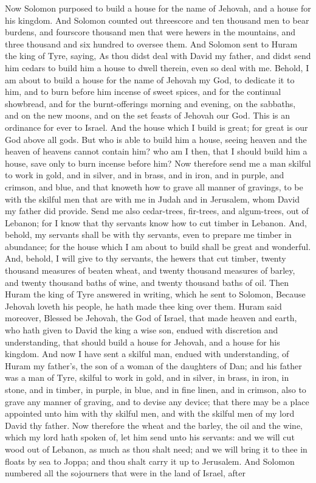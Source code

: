 Now Solomon purposed to build a house for the name of Jehovah, and a house for his kingdom. And Solomon counted out threescore and ten thousand men to bear burdens, and fourscore thousand men that were hewers in the mountains, and three thousand and six hundred to oversee them. And Solomon sent to Huram the king of Tyre, saying, As thou didst deal with David my father, and didst send him cedars to build him a house to dwell therein, even so deal with me. Behold, I am about to build a house for the name of Jehovah my God, to dedicate it to him, and to burn before him incense of sweet spices, and for the continual showbread, and for the burnt-offerings morning and evening, on the sabbaths, and on the new moons, and on the set feasts of Jehovah our God. This is an ordinance for ever to Israel. And the house which I build is great; for great is our God above all gods. But who is able to build him a house, seeing heaven and the heaven of heavens cannot contain him? who am I then, that I should build him a house, save only to burn incense before him? Now therefore send me a man skilful to work in gold, and in silver, and in brass, and in iron, and in purple, and crimson, and blue, and that knoweth how to grave all manner of gravings, to be with the skilful men that are with me in Judah and in Jerusalem, whom David my father did provide. Send me also cedar-trees, fir-trees, and algum-trees, out of Lebanon; for I know that thy servants know how to cut timber in Lebanon. And, behold, my servants shall be with thy servants, even to prepare me timber in abundance; for the house which I am about to build shall be great and wonderful. And, behold, I will give to thy servants, the hewers that cut timber, twenty thousand measures of beaten wheat, and twenty thousand measures of barley, and twenty thousand baths of wine, and twenty thousand baths of oil.  Then Huram the king of Tyre answered in writing, which he sent to Solomon, Because Jehovah loveth his people, he hath made thee king over them. Huram said moreover, Blessed be Jehovah, the God of Israel, that made heaven and earth, who hath given to David the king a wise son, endued with discretion and understanding, that should build a house for Jehovah, and a house for his kingdom. And now I have sent a skilful man, endued with understanding, of Huram my father’s, the son of a woman of the daughters of Dan; and his father was a man of Tyre, skilful to work in gold, and in silver, in brass, in iron, in stone, and in timber, in purple, in blue, and in fine linen, and in crimson, also to grave any manner of graving, and to devise any device; that there may be a place appointed unto him with thy skilful men, and with the skilful men of my lord David thy father. Now therefore the wheat and the barley, the oil and the wine, which my lord hath spoken of, let him send unto his servants: and we will cut wood out of Lebanon, as much as thou shalt need; and we will bring it to thee in floats by sea to Joppa; and thou shalt carry it up to Jerusalem.  And Solomon numbered all the sojourners that were in the land of Israel, after 